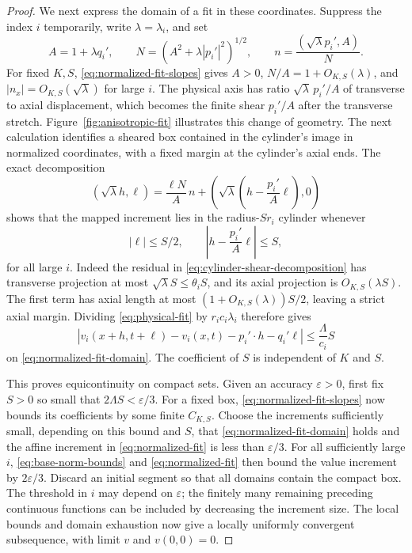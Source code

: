 \begin{proof}
We next express the domain of a fit in these coordinates. Suppress the index $i$ temporarily, write $\lambda=\lambda_i$, and set
\[
  A=1+\lambda q_i',\qquad N=(A^2+\lambda|p_i'|^2)^{1/2},
  \qquad n=\frac{(\sqrt\lambda p_i',A)}{N}.
\]
For fixed $K,S$, \eqref{eq:normalized-fit-slopes} gives $A>0$, $N/A=1+O_{K,S}(\lambda)$, and $|n_x|=O_{K,S}(\sqrt\lambda)$ for large $i$. The physical axis has ratio $\sqrt\lambda\,p_i'/A$ of transverse to axial displacement, which becomes the finite shear $p_i'/A$ after the transverse stretch. Figure~\ref{fig:anisotropic-fit} illustrates this change of geometry. The next calculation identifies a sheared box contained in the cylinder's image in normalized coordinates, with a fixed margin at the cylinder's axial ends. The exact decomposition
\begin{equation}\label{eq:cylinder-shear-decomposition}
  (\sqrt\lambda h,\ell)
   =\frac{\ell N}{A}\,n
       +\left(\sqrt\lambda\left(h-\frac{p_i'}A\ell\right),0\right)
\end{equation}
shows that the mapped increment lies in the radius-$Sr_i$ cylinder whenever
\begin{equation}\label{eq:normalized-fit-domain}
  |\ell|\le S/2,\qquad \left|h-\frac{p_i'}A\ell\right|\le S,
\end{equation}
for all large $i$. Indeed the residual in \eqref{eq:cylinder-shear-decomposition} has transverse projection at most $\sqrt\lambda S\le\theta_i S$, and its axial projection is $O_{K,S}(\lambda S)$. The first term has axial length at most $(1+O_{K,S}(\lambda))S/2$, leaving a strict axial margin. Dividing \eqref{eq:physical-fit} by $r_i c_i\lambda_i$ therefore gives
\begin{equation}\label{eq:normalized-fit}
  |v_i(x+h,t+\ell)-v_i(x,t)-p_i'\cdot h-q_i'\ell|
      \le\frac{\Lambda}{c_i}S
\end{equation}
on \eqref{eq:normalized-fit-domain}. The coefficient of $S$ is independent of $K$ and $S$.



This proves equicontinuity on compact sets. Given an accuracy $\varepsilon>0$, first fix $S>0$ so small that $2\Lambda S<\varepsilon/3$. For a fixed box, \eqref{eq:normalized-fit-slopes} now bounds its coefficients by some finite $C_{K,S}$. Choose the increments sufficiently small, depending on this bound and $S$, that \eqref{eq:normalized-fit-domain} holds and the affine increment in \eqref{eq:normalized-fit} is less than $\varepsilon/3$. For all sufficiently large $i$, \eqref{eq:base-norm-bounds} and \eqref{eq:normalized-fit} then bound the value increment by $2\varepsilon/3$. Discard an initial segment so that all domains contain the compact box. The threshold in $i$ may depend on $\varepsilon$; the finitely many remaining preceding continuous functions can be included by decreasing the increment size. The local bounds and domain exhaustion now give a locally uniformly convergent subsequence, with limit $v$ and $v(0,0)=0$.


\end{proof}
